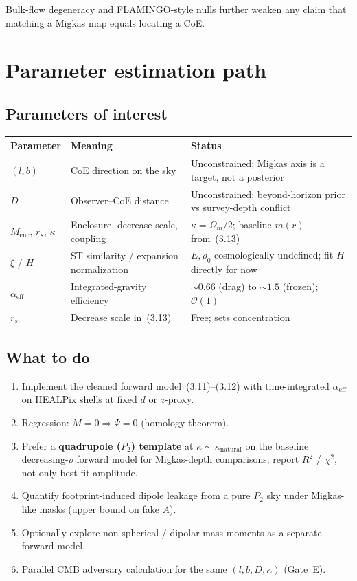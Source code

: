 \documentclass[11pt,a4paper]{article}
\begin{document}
Bulk-flow degeneracy \cite{Migkas2021} and FLAMINGO-style nulls further weaken any claim that matching a Migkas map equals locating a CoE.

\section{Parameter estimation path}

\subsection{Parameters of interest}

\begin{table}[ht]
\centering
\begin{tabular}{@{}lll@{}}
\toprule
Parameter & Meaning & Status \\
\midrule
\((l,b)\) & CoE direction on the sky & Unconstrained; Migkas axis is a target, not a posterior \\
\(D\) & Observer--CoE distance & Unconstrained; beyond-horizon prior vs survey-depth conflict \\
\(M_{\mathrm{enc}}\), \(r_s\), \(\kappa\) & Enclosure, decrease scale, coupling & \(\kappa=\Omega_m/2\); baseline \(m(r)\) from~(3.13) \\
\(\xi\) / \(H\) & ST similarity / expansion normalization & \(E,\rho_0\) cosmologically undefined; fit \(H\) directly for now \\
\(\alpha_{\mathrm{eff}}\) & Integrated-gravity efficiency & \(\sim 0.66\) (drag) to \(\sim 1.5\) (frozen); \(\mathcal{O}(1)\) \\
\(r_s\) & Decrease scale in~(3.13) & Free; sets concentration \\
\bottomrule
\end{tabular}
\end{table}

\subsection{What to do}

\begin{enumerate}
\item Implement the cleaned forward model~(3.11)--(3.12) with time-integrated \(\alpha_{\mathrm{eff}}\) on HEALPix shells at fixed \(d\) or \(z\)-proxy.
\item Regression: \(M=0\Rightarrow\Psi=0\) (homology theorem).
\item Prefer a \textbf{quadrupole (\(P_2\)) template} at \(\kappa\sim\kappa_{\mathrm{natural}}\) on the baseline decreasing-\(\rho\) forward model for Migkas-depth comparisons; report \(R^2\) / \(\chi^2\), not only best-fit amplitude.
\item Quantify footprint-induced dipole leakage from a pure \(P_2\) sky under Migkas-like masks (upper bound on fake \(A\)).
\item Optionally explore non-spherical / dipolar mass moments as a separate forward model.
\item Parallel CMB adversary calculation for the same \((l,b,D,\kappa)\) (Gate~E).
\end{enumerate}
\end{document}

